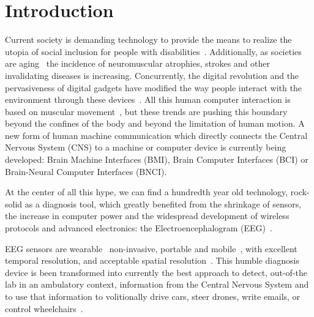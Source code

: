 \documentclass[brainsci,article,submit,moreauthors,pdftex,10pt,a4paper]{mdpi}
\begin{document}

\setcounter{section}{-1} %

\section{Introduction}






Current society is demanding technology to provide the means to realize the utopia of social inclusion for people with disabilities~\citep{Wolpaw2002}.  Additionally, as societies are aging~\citep{Lutz2008} the incidence of neuromuscular atrophies, strokes and other invalidating diseases is increasing.  Concurrently, the digital revolution and the pervasiveness of digital gadgets have modified the way people interact with the environment through these devices~\citep{Domingo2012}.  All this human computer interaction is based on muscular movement~\citep{Guger2017}, but these trends are pushing this boundary beyond the confines of the body and beyond the limitation of human motion.  A new form of human machine communication which directly connects the Central Nervous System (CNS) to a machine or computer device is currently being developed: Brain Machine Interfaces (BMI), Brain Computer Interfaces (BCI) or Brain-Neural Computer Interfaces (BNCI).

At the center of all this hype, we can find a hundredth year old technology, rock-solid as a diagnosis tool, which greatly benefited from the shrinkage of sensors, the increase in computer power and the widespread development of wireless protocols and advanced electronics: the Electroencephalogram (EEG)~\citep{Schomer2010}.

EEG sensors are wearable~\citep{Puce2017} non-invasive, portable and mobile~\citep{DeVos2014}, with excellent temporal resolution, and acceptable spatial resolution~\citep{Hartman2005}.  This humble diagnosis device is been transformed into currently the best approach to detect, out-of-the lab in an ambulatory context, information from the Central Nervous System and to use that information to volitionally drive cars, steer drones, write emails, or control wheelchairs~\citep{Yuste2017}.
\end{document}
